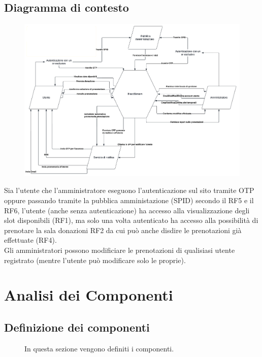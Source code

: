 \documentclass{article}
\begin{document}
\subsection{Diagramma di contesto}
\begin{description}


\begin{figure}[htp]
		\centering
		\includegraphics[width=\textwidth]{context-diag.png}
	\end{figure}

\item[] Sia l'utente che l'amministratore eseguono l'autenticazione sul sito tramite OTP oppure passando tramite la pubblica amministazione (SPID) secondo il RF5 e il RF6, l'utente (anche senza autenticazione) ha accesso alla visualizzazione degli slot disponibili (RF1), ma solo una volta autenticato ha accesso alla possibilità di prenotare la sala donazioni RF2 da cui può anche disdire le prenotazioni già effettuate (RF4). \\ Gli amministratori possono modificiare le prenotazioni di qualisiasi utente registrato (mentre l'utente può modificare solo le proprie).
\end{description}
\clearpage

\section{Analisi dei Componenti}
\subsection{Definizione dei componenti}
\begin{description}
	\item[] In questa sezione vengono definiti i componenti.
\end{description}
\end{document}

